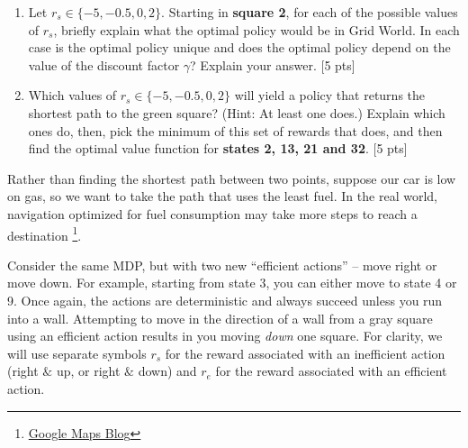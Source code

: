 \begin{enumerate}[label=(\alph*)]
\item  Let $r_s \in \{-5,-0.5,0,2\}$. Starting in \textbf{square 2}, for each of the possible values of $r_s$, briefly explain what the optimal policy would be in Grid World. In each case is the optimal policy unique and does the optimal policy depend on the value of the discount factor $\gamma$? Explain your answer.   [5 pts]


\item Which values of $r_s \in \{-5, -0.5, 0, 2\}$ will yield a policy that returns the shortest path to the green square? (Hint: At least one does.) Explain which ones do, then, pick the minimum of this set of rewards that does, and then find the optimal value function for \textbf{states 2, 13, 21 and 32}. [5 pts]

\end{enumerate}

\noindent Rather than finding the shortest path between two points, suppose our car is low on gas, so we want to take the path that uses the least fuel. In the real world, navigation optimized for fuel consumption may take more steps to reach a destination \footnote{\href{https://blog.google/products/maps/3-new-ways-navigate-more-sustainably-maps/}{Google Maps Blog}}. 

Consider the same MDP, but with two new ``efficient actions'' -- move right or move down. For example, starting from state 3, you can either move to state 4 or 9. Once again, the actions are deterministic and always succeed unless you run into a wall. Attempting to move in the direction of a wall from a gray square using an efficient action results in you moving \textit{down} one square. For clarity, we will use separate symbols $r_s$ for the reward associated with an inefficient action (right $\&$ up, or  right $\&$ down) and $r_e$ for the reward associated with an efficient action.

